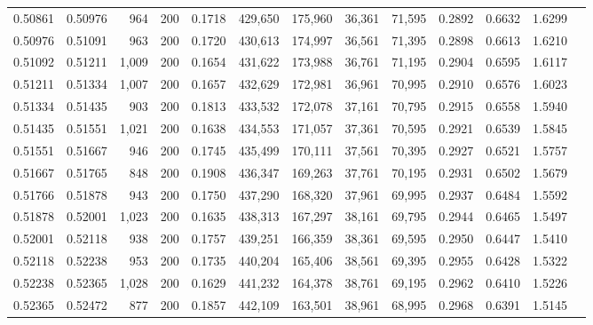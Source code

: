 \begin{tabular}{rrrrrrrrrrrrr}
0.50861 & 0.50976 &    964 & 200 &                                     0.1718 & 429,650 & 175,960 &  36,361 &  71,595 & 0.2892 & 0.6632 & 1.6299 \\
0.50976 & 0.51091 &    963 & 200 &                                     0.1720 & 430,613 & 174,997 &  36,561 &  71,395 & 0.2898 & 0.6613 & 1.6210 \\
0.51092 & 0.51211 &  1,009 & 200 &                                     0.1654 & 431,622 & 173,988 &  36,761 &  71,195 & 0.2904 & 0.6595 & 1.6117 \\
0.51211 & 0.51334 &  1,007 & 200 &                                     0.1657 & 432,629 & 172,981 &  36,961 &  70,995 & 0.2910 & 0.6576 & 1.6023 \\
0.51334 & 0.51435 &    903 & 200 &                                     0.1813 & 433,532 & 172,078 &  37,161 &  70,795 & 0.2915 & 0.6558 & 1.5940 \\
0.51435 & 0.51551 &  1,021 & 200 &                                     0.1638 & 434,553 & 171,057 &  37,361 &  70,595 & 0.2921 & 0.6539 & 1.5845 \\
0.51551 & 0.51667 &    946 & 200 &                                     0.1745 & 435,499 & 170,111 &  37,561 &  70,395 & 0.2927 & 0.6521 & 1.5757 \\
0.51667 & 0.51765 &    848 & 200 &                                     0.1908 & 436,347 & 169,263 &  37,761 &  70,195 & 0.2931 & 0.6502 & 1.5679 \\
0.51766 & 0.51878 &    943 & 200 &                                     0.1750 & 437,290 & 168,320 &  37,961 &  69,995 & 0.2937 & 0.6484 & 1.5592 \\
0.51878 & 0.52001 &  1,023 & 200 &                                     0.1635 & 438,313 & 167,297 &  38,161 &  69,795 & 0.2944 & 0.6465 & 1.5497 \\
0.52001 & 0.52118 &    938 & 200 &                                     0.1757 & 439,251 & 166,359 &  38,361 &  69,595 & 0.2950 & 0.6447 & 1.5410 \\
0.52118 & 0.52238 &    953 & 200 &                                     0.1735 & 440,204 & 165,406 &  38,561 &  69,395 & 0.2955 & 0.6428 & 1.5322 \\
0.52238 & 0.52365 &  1,028 & 200 &                                     0.1629 & 441,232 & 164,378 &  38,761 &  69,195 & 0.2962 & 0.6410 & 1.5226 \\
0.52365 & 0.52472 &    877 & 200 &                                     0.1857 & 442,109 & 163,501 &  38,961 &  68,995 & 0.2968 & 0.6391 & 1.5145 \\

\end{tabular}
